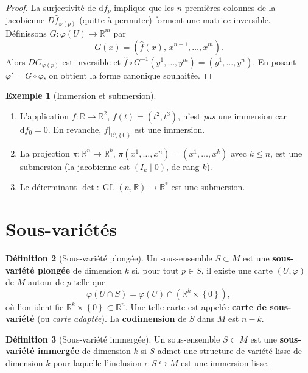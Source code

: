 \documentclass[12pt,a4paper,openany]{book}
\theoremstyle{definition}
\newtheorem{definition}{Définition}[chapter]
\newtheorem{exemple}[definition]{Exemple}
\theoremstyle{plain}
\theoremstyle{remark}
\newcommand{\R}{\mathbb{R}}
\DeclareMathOperator{\GL}{GL}
\newcommand{\dd}{\mathrm{d}}
\newcommand{\set}[1]{\left\{#1\right\}}
\begin{document}
\begin{proof}
La surjectivité de $\dd f_p$ implique que les $n$ premières colonnes de la jacobienne
$D\hat{f}_{\varphi(p)}$ (quitte à permuter) forment une matrice inversible.
Définissons $G : \varphi(U) \to \R^m$ par
\[
  G(x) = (\hat{f}(x),\, x^{n+1}, \ldots, x^m).
\]
Alors $DG_{\varphi(p)}$ est inversible et $\hat{f} \circ G^{-1}(y^1, \ldots, y^m) = (y^1, \ldots, y^n)$.
En posant $\varphi' = G \circ \varphi$, on obtient la forme canonique souhaitée.
\end{proof}

\begin{exemple}[Immersion et submersion]\label{ex:immersion-submersion}
\begin{enumerate}[label=(\roman*)]
  \item L'application $f : \R \to \R^2$, $f(t) = (t^2, t^3)$, n'est \emph{pas}
    une immersion car $\dd f_0 = 0$. En revanche, $f|_{\R \setminus \set{0}}$ est une immersion.
  \item La projection $\pi : \R^n \to \R^k$, $\pi(x^1, \ldots, x^n) = (x^1, \ldots, x^k)$
    avec $k \leqslant n$, est une submersion (la jacobienne est $(I_k \mid 0)$, de rang $k$).
  \item Le déterminant $\det : \GL(n, \R) \to \R^*$ est une submersion.
\end{enumerate}
\end{exemple}

\section{Sous-variétés}\label{sec:sous-varietes}

\begin{definition}[Sous-variété plongée]\label{def:sous-variete-plongee}
Un sous-ensemble $S \subset M$ est une \textbf{sous-variété plongée} de dimension $k$
si, pour tout $p \in S$, il existe une carte $(U, \varphi)$ de $M$ autour de $p$ telle que
\[
  \varphi(U \cap S) = \varphi(U) \cap (\R^k \times \set{0}),
\]
où l'on identifie $\R^k \times \set{0} \subset \R^n$. Une telle carte est appelée
\textbf{carte de sous-variété} (ou \emph{carte adaptée}).
La \textbf{codimension} de $S$ dans $M$ est $n - k$.
\end{definition}

\begin{definition}[Sous-variété immergée]\label{def:sous-variete-immergee}
Un sous-ensemble $S \subset M$ est une \textbf{sous-variété immergée} de dimension $k$
si $S$ admet une structure de variété lisse de dimension $k$ pour laquelle l'inclusion
$\iota : S \hookrightarrow M$ est une immersion lisse.
\end{definition}
\end{document}
